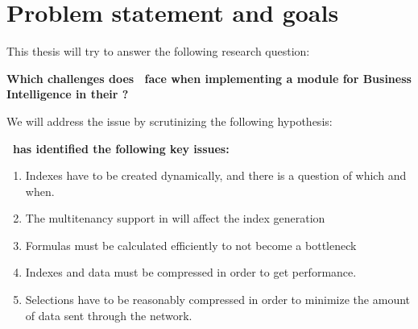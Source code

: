 \section{Problem statement and goals}
\label{sec:problem-statement-and-goals}
This thesis will try to answer the following research question:

\textbf{Which challenges does \genus~face when implementing a module for Business Intelligence in their \genusSoftware?}

We will address the issue by scrutinizing the following hypothesis:

\textbf{\genus~has identified the following key issues:}
\begin{enumerate}\bfseries
  \item Indexes have to be created dynamically, and there is a question of which and when.
  \item The multitenancy support in \genusSoftware will affect the index generation
  \item Formulas must be calculated efficiently to not become a bottleneck
  \item Indexes and data must be compressed in order to get performance.
  \item Selections have to be reasonably compressed in order to minimize the amount of data sent through the network.
\end{enumerate}

